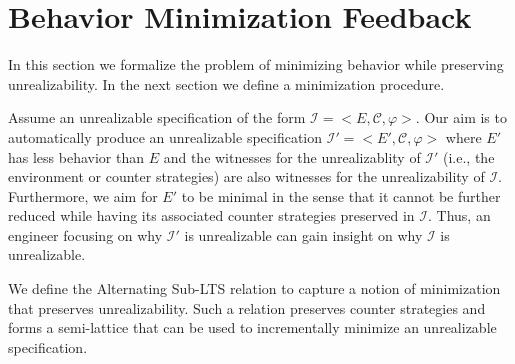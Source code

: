 \section{Behavior Minimization Feedback}\label{sec:problemStatement}

In this section we formalize the problem of minimizing behavior while preserving unrealizability. In the next section we define a minimization procedure.

Assume an unrealizable specification of the form $\mathcal{I} = <E, \mathcal{C}, \varphi>$. Our aim is to automatically produce an unrealizable specification $\mathcal{I'} = <E', \mathcal{C}, \varphi>$ where $E'$ has less behavior than $E$ and the witnesses for the unrealizablity of $\mathcal{I'}$ (i.e., the environment or counter strategies) are also witnesses for the unrealizability of $\mathcal{I}$.  Furthermore, we aim for $E'$ to be minimal in the sense that it cannot be further reduced while having its associated counter strategies preserved in  $\mathcal{I}$.
Thus, an engineer focusing on why  $\mathcal{I'}$ is unrealizable can gain insight on why $\mathcal{I}$ is unrealizable. 

%


We define the Alternating Sub-LTS relation to capture a notion of minimization that preserves unrealizability. Such a relation preserves counter strategies and forms a semi-lattice that can be used to incrementally minimize an unrealizable specification. 

%

